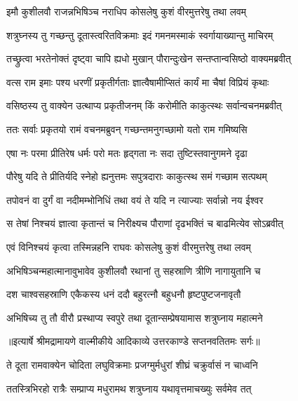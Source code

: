 \twolineshloka
{इमौ कुशीलवौ राजन्नभिषिञ्च नराधिप}
{कोसलेषु कुशं वीरमुत्तरेषु तथा लवम्} %

\twolineshloka
{शत्रुघ्नस्य तु गच्छन्तु दूतास्त्वरितविक्रमाः}
{इदं गमनमस्माकं स्वर्गायाख्यान्तु माचिरम्} %

\twolineshloka
{तच्छ्रुत्वा भरतेनोक्तं दृष्ट्वा चापि ह्यधो मुखान्}
{पौरान्दुःखेन सन्तप्तान्वसिष्ठो वाक्यमब्रवीत्} %

\twolineshloka
{वत्स राम इमाः पश्य धरणीं प्रकृतीर्गताः}
{ज्ञात्वैषामीप्सितं कार्यं मा चैषां विप्रियं कृथाः} %

\twolineshloka
{वसिष्ठस्य तु वाक्येन उत्थाप्य प्रकृतीजनम्}
{किं करोमीति काकुत्स्थः सर्वान्वचनमब्रवीत्} %

\twolineshloka
{ततः सर्वाः प्रकृतयो रामं वचनमब्रुवन्}
{गच्छन्तमनुगच्छामो यतो राम गमिष्यसि} %

\twolineshloka
{एषा नः परमा प्रीतिरेष धर्मः परो मतः}
{हृद्गता नः सदा तुष्टिस्तवानुगमने दृढा} %

\twolineshloka
{पौरेषु यदि ते प्रीतिर्यदि स्नेहो ह्यनुत्तमः}
{सपुत्रदाराः काकुत्स्थ समं गच्छाम सत्पथम्} %

\twolineshloka
{तपोवनं वा दुर्गं वा नदीमम्भोनिधिं तथा}
{वयं ते यदि न त्याज्याः सर्वान्नो नय ईश्वर} %

\twolineshloka
{स तेषां निश्चयं ज्ञात्वा कृतान्तं च निरीक्ष्यच}
{पौराणां दृढभक्तिं च बाढमित्येव सोऽब्रवीत्} %

\twolineshloka
{एवं विनिश्चयं कृत्वा तस्मिन्नहनि राघवः}
{कोसलेषु कुशं वीरमुत्तरेषु तथा लवम्} %

\twolineshloka
{अभिषिञ्चन्महात्मानावुभावेव कुशीलवौ}
{रथानां तु सहस्राणि त्रीणि नागायुतानि च} %

\twolineshloka
{दश चाश्वसहस्राणि एकैकस्य धनं ददौ}
{बहुरत्नौ बहुधनौ हृष्टपुष्टजनावृतौ} %

\twolineshloka
{अभिषिच्य तु तौ वीरौ प्रस्थाप्य स्वपुरे तथा}
{दूतान्सम्प्रेषयामास शत्रुघ्नाय महात्मने} %


{॥इत्यार्षे श्रीमद्रामायणे वाल्मीकीये आदिकाव्ये उत्तरकाण्डे सप्तनवतितमः सर्गः॥}


\twolineshloka
{ते दूता रामवाक्येन चोदिता लघुविक्रमाः}
{प्रजग्मुर्मधुरां शीघ्रं चक्रुर्वासं न चाध्वनि} %

\twolineshloka
{ततस्त्रिभिरहो रात्रैः सम्प्राप्य मधुरामथ}
{शत्रुघ्नाय यथावृत्तमाचख्युः सर्वमेव तत्} %

